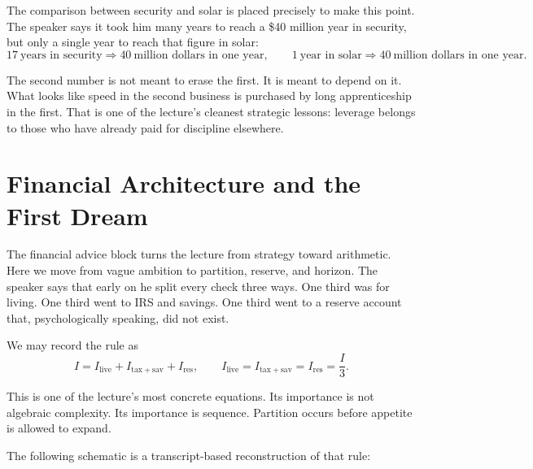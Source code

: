The comparison between security and solar is placed precisely to make this point. The speaker says it took him many years to reach a \$40 million year in security, but only a single year to reach that figure in solar:
\begin{equation}
17\ \text{years in security} \Longrightarrow 40\ \text{million dollars in one year},
\qquad
1\ \text{year in solar} \Longrightarrow 40\ \text{million dollars in one year}.
\end{equation}

The second number is not meant to erase the first. It is meant to depend on it. What looks like speed in the second business is purchased by long apprenticeship in the first. That is one of the lecture's cleanest strategic lessons: leverage belongs to those who have already paid for discipline elsewhere.

\section{Financial Architecture and the First Dream}

The financial advice block turns the lecture from strategy toward arithmetic. Here we move from vague ambition to partition, reserve, and horizon. The speaker says that early on he split every check three ways. One third was for living. One third went to IRS and savings. One third went to a reserve account that, psychologically speaking, did not exist.

We may record the rule as
\begin{equation}
I = I_{\mathrm{live}} + I_{\mathrm{tax+sav}} + I_{\mathrm{res}},
\qquad
I_{\mathrm{live}} = I_{\mathrm{tax+sav}} = I_{\mathrm{res}} = \frac{I}{3}.
\end{equation}

This is one of the lecture's most concrete equations. Its importance is not algebraic complexity. Its importance is sequence. Partition occurs before appetite is allowed to expand.

The following schematic is a transcript-based reconstruction of that rule:

\begin{figure}
\centering
{}
\end{figure}


